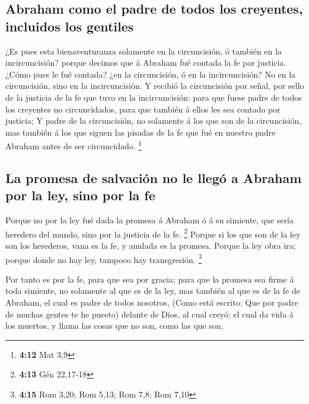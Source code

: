\hypertarget{abraham-como-el-padre-de-todos-los-creyentes-incluidos-los-gentiles}{%
\subsection{Abraham como el padre de todos los creyentes, incluidos los
gentiles}\label{abraham-como-el-padre-de-todos-los-creyentes-incluidos-los-gentiles}}

 ¿Es pues esta bienaventuranza solamente en la circuncisión,
ó también en la incircuncisión? porque decimos que á Abraham fué contada
la fe por justicia.  ¿Cómo pues le fué contada? ¿en la
circuncisión, ó en la incircuncisión? No en la circuncisión, sino en la
incircuncisión.  Y recibió la circuncisión por señal, por
sello de la justicia de la fe que tuvo en la incircuncisión: para que
fuese padre de todos los creyentes no circuncidados, para que también á
ellos les sea contado por justicia;  Y padre de la
circuncisión, no solamente á los que son de la circuncisión, mas también
á los que siguen las pisadas de la fe que fué en nuestro padre Abraham
antes de ser circuncidado. \footnote{\textbf{4:12} Mat 3,9}

\hypertarget{la-promesa-de-salvaciuxf3n-no-le-lleguxf3-a-abraham-por-la-ley-sino-por-la-fe}{%
\subsection{La promesa de salvación no le llegó a Abraham por la ley,
sino por la
fe}\label{la-promesa-de-salvaciuxf3n-no-le-lleguxf3-a-abraham-por-la-ley-sino-por-la-fe}}

 Porque no por la ley fué dada la promesa á Abraham ó á su
simiente, que sería heredero del mundo, sino por la justicia de la fe.
\footnote{\textbf{4:13} Gén 22,17-18}  Porque si los que
son de la ley son los herederos, vana es la fe, y anulada es la promesa.
 Porque la ley obra ira; porque donde no hay ley, tampoco
hay transgresión. \footnote{\textbf{4:15} Rom 3,20; Rom 5,13; Rom 7,8;
  Rom 7,10}

 Por tanto es por la fe, para que sea por gracia; para que
la promesa sea firme á toda simiente, no solamente al que es de la ley,
mas también al que es de la fe de Abraham, el cual es padre de todos
nosotros,  (Como está escrito: Que por padre de muchas
gentes te he puesto) delante de Dios, al cual creyó; el cual da vida á
los muertos, y llama las cosas que no son, como las que son.

